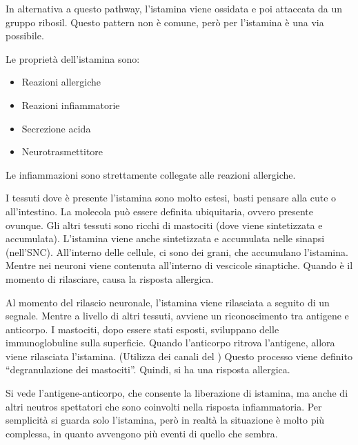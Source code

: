 In alternativa a questo pathway, l'istamina viene ossidata e poi
attaccata da un gruppo ribosil. Questo pattern non è comune, però per
l'istamina è una via possibile.

Le proprietà dell'istamina sono:
\begin{itemize}
    \item Reazioni allergiche 
    \item Reazioni infiammatorie
    \item Secrezione acida
    \item Neurotrasmettitore
\end{itemize}

Le infiammazioni sono strettamente collegate alle reazioni allergiche.

I tessuti dove è presente l'istamina sono molto estesi, basti pensare
alla cute o all'intestino. La molecola può essere definita ubiquitaria,
ovvero presente ovunque.
Gli altri tessuti sono ricchi di mastociti (dove viene sintetizzata e
accumulata). L'istamina viene anche sintetizzata e accumulata nelle
sinapsi (nell'SNC).
All'interno delle cellule, ci sono dei grani, che accumulano l'istamina.
Mentre nei neuroni viene contenuta all'interno di vescicole sinaptiche.
Quando è il momento di rilasciare, causa la risposta allergica.

Al momento del rilascio neuronale, l'istamina viene rilasciata a seguito
di un segnale. Mentre a livello di altri tessuti, avviene un
riconoscimento tra antigene e anticorpo. I mastociti, dopo essere stati
esposti, sviluppano delle immunoglobuline sulla superficie. Quando
l'anticorpo ritrova l'antigene, allora viene rilasciata l'istamina.
(Utilizza dei canali del )
Questo processo viene definito ``degranulazione dei mastociti''. Quindi,
si ha una risposta allergica.


Si vede l'antigene-anticorpo, che consente la liberazione di istamina,
ma anche di altri neutros spettatori che sono coinvolti nella risposta
infiammatoria.
Per semplicità si guarda solo l'istamina, però in realtà la situazione è
molto più complessa, in quanto avvengono più eventi di quello che sembra.


